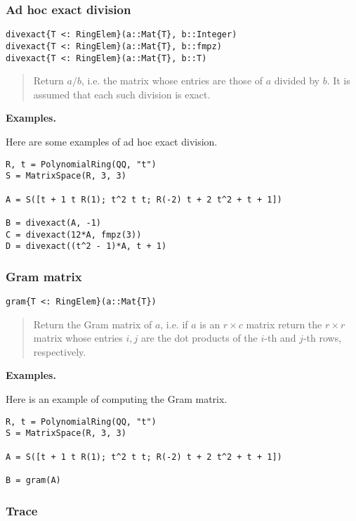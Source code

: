 \documentclass[a4paper,10pt]{article}
\newcommand{\desc}[1]{\vspace{-3mm}\begin{quote}#1\end{quote}}
\begin{document}
\subsubsection{Ad hoc exact division}

\begin{lstlisting}
divexact{T <: RingElem}(a::Mat{T}, b::Integer)
divexact{T <: RingElem}(a::Mat{T}, b::fmpz)
divexact{T <: RingElem}(a::Mat{T}, b::T)
\end{lstlisting}

\desc{Return $a/b$, i.e. the matrix whose entries are those of $a$ divided
by $b$. It is assumed that each such division is exact.}

\textbf{Examples.}

Here are some examples of ad hoc exact division.

\begin{lstlisting}
R, t = PolynomialRing(QQ, "t")
S = MatrixSpace(R, 3, 3)

A = S([t + 1 t R(1); t^2 t t; R(-2) t + 2 t^2 + t + 1])

B = divexact(A, -1)
C = divexact(12*A, fmpz(3))
D = divexact((t^2 - 1)*A, t + 1)
\end{lstlisting}

\subsubsection{Gram matrix}

\begin{lstlisting}
gram{T <: RingElem}(a::Mat{T})
\end{lstlisting}

\desc{Return the Gram matrix of $a$, i.e. if $a$ is an $r\times c$ matrix
return the $r\times r$ matrix whose entries $i, j$ are the dot products
of the $i$-th and $j$-th rows, respectively.}

\textbf{Examples.}

Here is an example of computing the Gram matrix.

\begin{lstlisting}
R, t = PolynomialRing(QQ, "t")
S = MatrixSpace(R, 3, 3)

A = S([t + 1 t R(1); t^2 t t; R(-2) t + 2 t^2 + t + 1])

B = gram(A)
\end{lstlisting}

\subsubsection{Trace}
\end{document}
